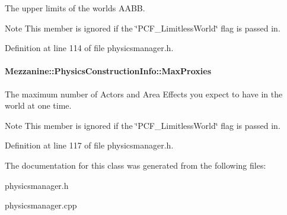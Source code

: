 The upper limits of the worlds AABB. 

\begin{DoxyNote}{Note}
This member is ignored if the \char`\"{}PCF\_\-LimitlessWorld\char`\"{} flag is passed in. 
\end{DoxyNote}


Definition at line 114 of file physicsmanager.h.

\hypertarget{classMezzanine_1_1PhysicsConstructionInfo_a33cf4caa561d10c3d1df0ea150612c95}{
\paragraph[{MaxProxies}]{ {\bf Mezzanine::PhysicsConstructionInfo::MaxProxies}}\hfill}
\label{classMezzanine_1_1PhysicsConstructionInfo_a33cf4caa561d10c3d1df0ea150612c95}


The maximum number of Actors and Area Effects you expect to have in the world at one time. 

\begin{DoxyNote}{Note}
This member is ignored if the \char`\"{}PCF\_\-LimitlessWorld\char`\"{} flag is passed in. 
\end{DoxyNote}


Definition at line 117 of file physicsmanager.h.



The documentation for this class was generated from the following files:\begin{DoxyCompactItemize}
\item 
physicsmanager.h\item 
physicsmanager.cpp\end{DoxyCompactItemize}
